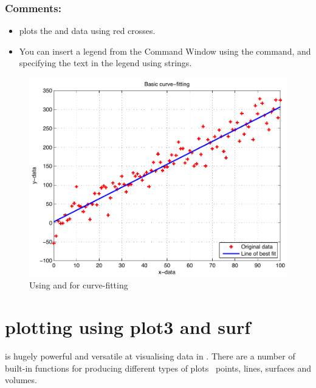 \subsubsection{Comments:}
\begin{itemize}
\item {} plots the  and  data using red crosses.
\item You can insert a legend from the Command Window using the  command, and specifying the text in the legend using strings.
\end{itemize}
\begin{figure}
	\myfloatalign
	\includegraphics[width=\linewidth]{Graphics/Unit02/curve_fitting}
	\caption{Using  and  for curve-fitting}
	\label{fig:curve_fitting}
\end{figure}

\section{\threed plotting using plot3 and surf}
\mlab is hugely powerful and versatile at visualising data in \threed. There are a number of built-in functions for producing different types of  \threed plots \eg\ points, lines, surfaces and volumes.

